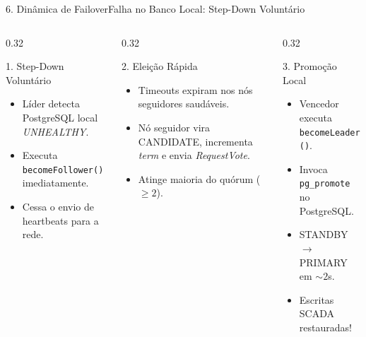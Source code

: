 \documentclass[aspectratio=169,10pt]{beamer}
\begin{document}
\begin{frame}{6. Dinâmica de Failover}{Falha no Banco Local: Step-Down Voluntário}
  \begin{columns}[t]
    \begin{column}{0.32\textwidth}
      \begin{block}{1. Step-Down Voluntário}
        \begin{itemize}
          \item Líder detecta PostgreSQL local \textit{UNHEALTHY}.
          \item Executa \texttt{becomeFollower()} imediatamente.
          \item Cessa o envio de heartbeats para a rede.
        \end{itemize}
      \end{block}
    \end{column}
    \begin{column}{0.32\textwidth}
      \begin{block}{2. Eleição Rápida}
        \begin{itemize}
          \item Timeouts expiram nos nós seguidores saudáveis.
          \item Nó seguidor vira CANDIDATE, incrementa \textit{term} e envia \textit{RequestVote}.
          \item Atinge maioria do quórum ($\ge 2$).
        \end{itemize}
      \end{block}
    \end{column}
    \begin{column}{0.32\textwidth}
      \begin{exampleblock}{3. Promoção Local}
        \begin{itemize}
          \item Vencedor executa \texttt{becomeLeader()}.
          \item Invoca \texttt{pg\_promote} no PostgreSQL.
          \item STANDBY $\rightarrow$ PRIMARY em $\sim 2$s.
          \item Escritas SCADA restauradas!
        \end{itemize}
      \end{exampleblock}
    \end{column}
  \end{columns}
\end{frame}
\end{document}
